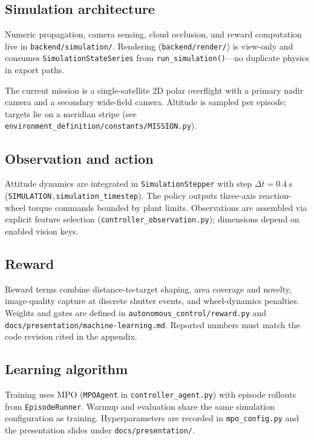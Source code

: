 \label{sec:methods}

\subsection{Simulation architecture}
Numeric propagation, camera sensing, cloud occlusion, and reward computation live in \texttt{backend/simulation/}.
Rendering (\texttt{backend/render/}) is view-only and consumes \texttt{SimulationStateSeries} from \texttt{run\_simulation()}---no duplicate physics in export paths.

The current mission is a single-satellite 2D polar overflight with a primary nadir camera and a secondary wide-field camera.
Altitude is sampled per episode; targets lie on a meridian stripe (see \texttt{environment\_definition/constants/MISSION.py}).

\subsection{Observation and action}
Attitude dynamics are integrated in \texttt{SimulationStepper} with step $\Delta t = \SI{0.4}{\second}$ (\texttt{SIMULATION.simulation\_timestep}).
The policy outputs three-axis reaction-wheel torque commands bounded by plant limits.
Observations are assembled via explicit feature selection (\texttt{controller\_observation.py}); dimensions depend on enabled vision keys.

\subsection{Reward}
Reward terms combine distance-to-target shaping, area coverage and novelty, image-quality capture at discrete shutter events, and wheel-dynamics penalties.
Weights and gates are defined in \texttt{autonomous\_control/reward.py} and \texttt{docs/presentation/machine-learning.md}.
Reported numbers must match the code revision cited in the appendix.

\subsection{Learning algorithm}
Training uses MPO (\texttt{MPOAgent} in \texttt{controller\_agent.py}) with episode rollouts from \texttt{EpisodeRunner}.
Warmup and evaluation share the same simulation configuration as training.
Hyperparameters are recorded in \texttt{mpo\_config.py} and the presentation slides under \texttt{docs/presentation/}.


